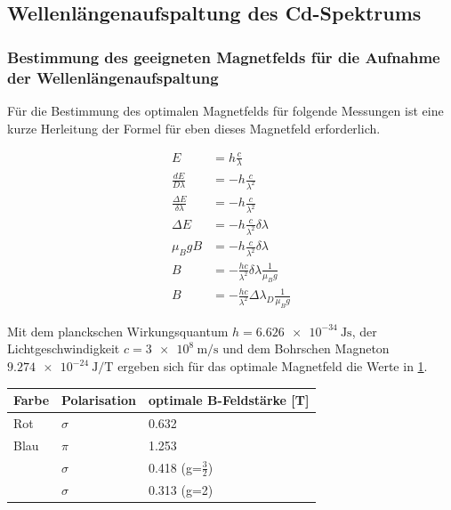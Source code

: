 \subsection{Wellenlängenaufspaltung des Cd-Spektrums}

\subsubsection{Bestimmung des geeigneten Magnetfelds für die Aufnahme der Wellenlängenaufspaltung}

Für die Bestimmung des optimalen Magnetfelds für folgende Messungen ist eine kurze Herleitung der Formel für eben dieses Magnetfeld erforderlich.

\begin{align}
    E &= h \frac{c}{\lambda} \\
    \frac{dE}{D\lambda} &= -h \frac{c}{\lambda^2} \\
    \frac{\Delta E}{\delta \lambda} &= -h \frac{c}{\lambda^2} \\
    \Delta E &= -h \frac{c}{\lambda^2} \delta \lambda \\
    \mu_B g B &= -h \frac{c}{\lambda^2} \delta \lambda \\
    B &= -\frac{hc}{\lambda^2} \delta \lambda \frac{1}{\mu_B g} \\
    B &= -\frac{hc}{\lambda^2} \Delta \lambda_D \frac{1}{\mu_B g} 
\end{align}

\noindent Mit dem planckschen Wirkungsquantum $ h = \SI[separate-uncertainty=true]{6.626e-34}{\joule \second} $, der Lichtgeschwindigkeit $ c = \SI[separate-uncertainty=true]{3e8}{\metre \per \second} $ und dem Bohrschen Magneton $ \SI[separate-uncertainty=true]{9.274e-24}{\joule\per\tesla} $ ergeben sich für das optimale Magnetfeld die Werte in \ref{tab:3}.

\begin{minipage}{\linewidth}
    \begin{table}[H]
        \centering
    \begin{tabular}{lll}
        \toprule
        Farbe & Polarisation & optimale B-Feldstärke [T] \\
        \midrule
        Rot & $ \sigma $ & 0.632 \\
        Blau & $ \pi $ & 1.253 \\
             & $ \sigma $ & 0.418 (g=$ \frac{3}{2} $)\\
             & $ \sigma $ & 0.313 (g=2)\\
        \bottomrule   
    \end{tabular}
    
    \label{tab:3}
\end{table}
\end{minipage}

